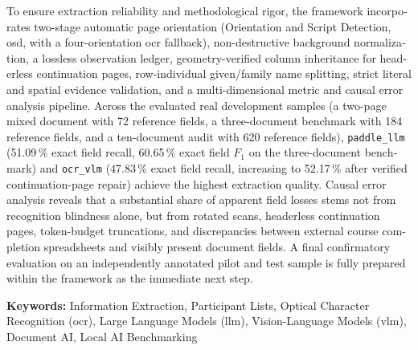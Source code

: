 \begin{otherlanguage}{english}
To ensure extraction reliability and methodological rigor, the framework incorporates two-stage automatic page orientation (Orientation and Script Detection, \acs{osd}, with a four-orientation \acs{ocr} fallback), non-destructive background normalization, a lossless observation ledger, geometry-verified column inheritance for headerless continuation pages, row-individual given/family name splitting, strict literal and spatial evidence validation, and a multi-dimensional metric and causal error analysis pipeline. Across the evaluated real development samples (a two-page mixed document with 72 reference fields, a three-document benchmark with 184 reference fields, and a ten-document audit with 620 reference fields), \texttt{paddle\_llm} (51.09\,\% exact field recall, 60.65\,\% exact field $F_1$ on the three-document benchmark) and \texttt{ocr\_vlm} (47.83\,\% exact field recall, increasing to 52.17\,\% after verified continuation-page repair) achieve the highest extraction quality. Causal error analysis reveals that a substantial share of apparent field losses stems not from recognition blindness alone, but from rotated scans, headerless continuation pages, token-budget truncations, and discrepancies between external course completion spreadsheets and visibly present document fields. A final confirmatory evaluation on an independently annotated pilot and test sample is fully prepared within the framework as the immediate next step.

\textbf{Keywords:} Information Extraction, Participant Lists, Optical Character Recognition (\acs{ocr}), Large Language Models (\acs{llm}), Vision-Language Models (\acs{vlm}), Document AI, Local AI Benchmarking
\end{otherlanguage}
